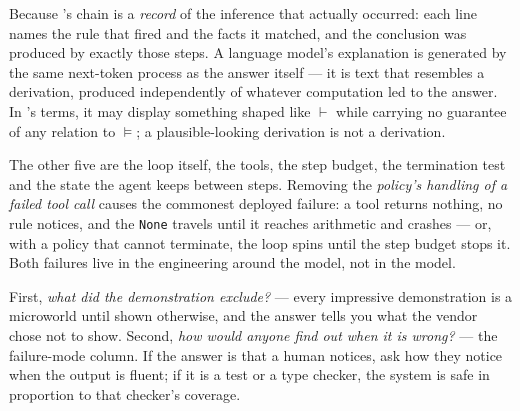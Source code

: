\begin{ans}
  \item Because 's chain is a \emph{record} of the inference that
        actually occurred: each line names the rule that fired and the facts it
        matched, and the conclusion was produced by exactly those steps. A language
        model's explanation is generated by the same next-token process as the
        answer itself --- it is text that resembles a derivation, produced
        independently of whatever computation led to the answer. In
        's terms, it may display something shaped like
        $\vdash$ while carrying no guarantee of any relation to $\models$; a
        plausible-looking derivation is not a derivation.
  \item The other five are the loop itself, the tools, the step budget, the
        termination test and the state the agent keeps between steps. Removing the
        \emph{policy's handling of a failed tool call} causes the commonest deployed
        failure: a tool returns nothing, no rule notices, and the \texttt{None}
        travels until it reaches arithmetic and crashes --- or, with a policy that
        cannot terminate, the loop spins until the step budget stops it. Both
        failures live in the engineering around the model, not in the model.
  \item First, \emph{what did the demonstration exclude?} --- every impressive
        demonstration is a microworld until shown otherwise, and the answer tells you
        what the vendor chose not to show. Second, \emph{how would anyone find out
        when it is wrong?} --- the failure-mode column. If the answer is that a
        human notices, ask how they notice when the output is fluent; if it is a
        test or a type checker, the system is safe in proportion to that checker's
        coverage.
\end{ans}

